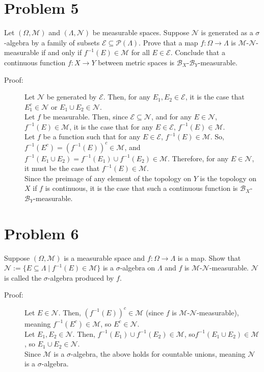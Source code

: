 \documentclass[10pt]{extarticle}
\begin{document}
  \section{Problem 5}%
  Let $(\Omega,\mathcal{M})$ and $(\Lambda,\mathcal{N})$ be measurable spaces. Suppose $\mathcal{N}$ is generated as a $\sigma$-algebra by a family of subsets $\mathcal{E}\subseteq \mathcal{P}(\Lambda)$. Prove that a map $f:\Omega \rightarrow \Lambda$ is $\mathcal{M}$-$\mathcal{N}$-measurable if and only if $f^{-1}(E)\in \mathcal{M}$ for all $E\in \mathcal{E}$. Conclude that a continuous function $f: X\rightarrow Y$ between metric spaces is $\mathcal{B}_{X}$-$\mathcal{B}_{Y}$-measurable.
  \begin{description}
    \item[Proof:] Let $\mathcal{N}$ be generated by $\mathcal{E}$. Then, for any $E_1,E_2\in \mathcal{E}$, it is the case that $E_1^{c}\in \mathcal{N}$ or $E_1\cup E_2\in \mathcal{N}$.\\

      Let $f$ be measurable. Then, since $\mathcal{E}\subseteq \mathcal{N}$, and for any $E\in \mathcal{N}$, $f^{-1}(E)\in \mathcal{M}$, it is the case that for any $E\in \mathcal{E}$, $f^{-1}(E)\in \mathcal{M}$.\\

      Let $f$ be a function such that for any $E\in \mathcal{E}$, $f^{-1}(E)\in \mathcal{M}$. So, $f^{-1}(E^{c}) = \left(f^{-1}(E)\right)^c \in \mathcal{M}$, and $f^{-1}(E_1\cup E_2) = f^{-1}(E_1)\cup f^{-1}(E_2) \in \mathcal{M}$. Therefore, for any $E\in \mathcal{N}$, it must be the case that $f^{-1}(E)\in \mathcal{M}$.\\

      Since the preimage of any element of the topology on $Y$ is the topology on $X$ if $f$ is continuous, it is the case that such a continuous function is $\mathcal{B}_{X}$-$\mathcal{B}_{Y}$-measurable.
  \end{description}
  \section{Problem 6}%
  Suppose $(\Omega,\mathcal{M})$ is a measurable space and $f: \Omega \rightarrow \Lambda$ is a map. Show that $\mathcal{N}:= \{E\subseteq \Lambda\mid f^{-1}(E)\in \mathcal{M}\}$ is a $\sigma$-algebra on $\Lambda$ and $f$ is $\mathcal{M}$-$\mathcal{N}$-measurable. $\mathcal{N}$ is called the $\sigma$-algebra produced by $f$.
  \begin{description}
    \item[Proof:] Let $E\in \mathcal{N}$. Then, $\left(f^{-1}(E)\right)^{c} \in \mathcal{M}$ (since $f$ is $\mathcal{M}$-$\mathcal{N}$-measurable), meaning $f^{-1}(E^{c})\in \mathcal{M}$, so $E^{c}\in \mathcal{N}$.\\

      Let $E_1,E_2\in \mathcal{N}$. Then, $f^{-1}(E_1)\cup f^{-1}(E_2) \in \mathcal{M}$, so$ f^{-1}(E_1\cup E_2)\in \mathcal{M}$, so $E_1\cup E_2\in \mathcal{N}$.\\

      Since $\mathcal{M}$ is a $\sigma$-algebra, the above holds for countable unions, meaning $\mathcal{N}$ is a $\sigma$-algebra.
  \end{description}
\end{document}
